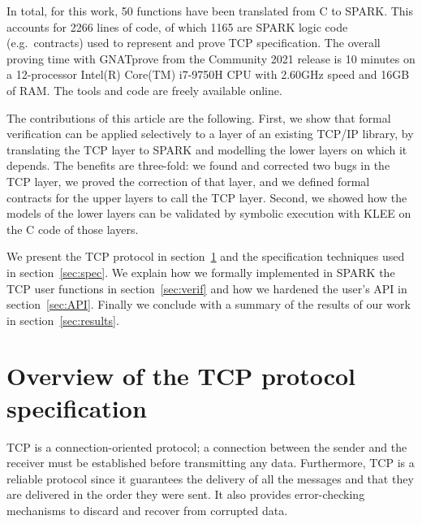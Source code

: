 \documentclass[conference]{IEEEtran}
\begin{document}
In total, for this work, 50 functions have been translated from C to SPARK. This accounts for 2266 lines of code, of which 1165 are SPARK logic code (e.g.\ contracts) used to represent and prove TCP specification. The overall proving time with GNATprove from the Community 2021 release is 10 minutes on a 12-processor Intel(R) Core(TM) i7-9750H CPU with 2.60GHz speed and 16GB of RAM. The tools and code are freely available online.

The contributions of this article are the following. First, we show that formal verification can be applied selectively to a layer of an existing TCP/IP library, by translating the TCP layer to SPARK and modelling the lower layers on which it depends. The benefits are three-fold: we found and corrected two bugs in the TCP layer, we proved the correction of that layer, and we defined formal contracts for the upper layers to call the TCP layer. Second, we showed how the models of the lower layers can be validated by symbolic execution with KLEE on the C code of those layers.

We present the TCP protocol in section~\ref{sec:TCP} and the specification
techniques used in section~\ref{sec:spec}. We explain how we formally
implemented in SPARK the TCP user functions in section~\ref{sec:verif} and how
we hardened the user's API in section~\ref{sec:API}. Finally we conclude with a
summary of the results of our work in section~\ref{sec:results}.

\section{Overview of the TCP protocol specification}
\label{sec:TCP}



TCP is a connection-oriented protocol; a connection between the sender and the receiver must be established before transmitting any data. Furthermore, TCP is a reliable protocol since it guarantees the delivery of all the messages and that they are delivered in the order they were sent. It also provides error-checking mechanisms to discard and recover from corrupted data.

\end{document}

